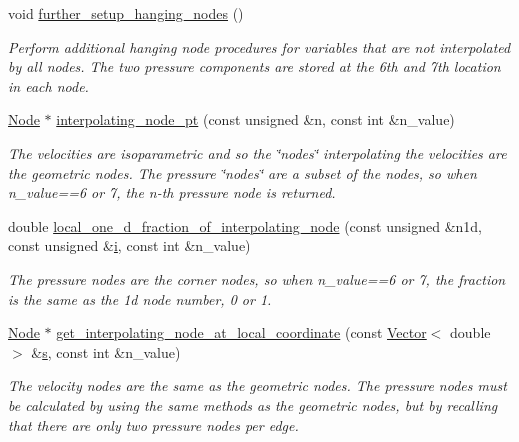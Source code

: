 \begin{DoxyCompactItemize}
void \hyperlink{classoomph_1_1RefineableLinearisedQTaylorHoodElement_a744e9dabce8e94de320d9baa362786af}{further\+\_\+setup\+\_\+hanging\+\_\+nodes} ()
\begin{DoxyCompactList}\small\item\em Perform additional hanging node procedures for variables that are not interpolated by all nodes. The two pressure components are stored at the 6th and 7th location in each node. \end{DoxyCompactList}\item 
\hyperlink{classoomph_1_1Node}{Node} $\ast$ \hyperlink{classoomph_1_1RefineableLinearisedQTaylorHoodElement_a85ac5379a96e6ca0cbe712218e494962}{interpolating\+\_\+node\+\_\+pt} (const unsigned \&n, const int \&n\+\_\+value)
\begin{DoxyCompactList}\small\item\em The velocities are isoparametric and so the \char`\"{}nodes\char`\"{} interpolating the velocities are the geometric nodes. The pressure \char`\"{}nodes\char`\"{} are a subset of the nodes, so when n\+\_\+value==6 or 7, the n-\/th pressure node is returned. \end{DoxyCompactList}\item 
double \hyperlink{classoomph_1_1RefineableLinearisedQTaylorHoodElement_a0dffc62fd56ef284763d9dc4ac7fa616}{local\+\_\+one\+\_\+d\+\_\+fraction\+\_\+of\+\_\+interpolating\+\_\+node} (const unsigned \&n1d, const unsigned \&\hyperlink{cfortran_8h_adb50e893b86b3e55e751a42eab3cba82}{i}, const int \&n\+\_\+value)
\begin{DoxyCompactList}\small\item\em The pressure nodes are the corner nodes, so when n\+\_\+value==6 or 7, the fraction is the same as the 1d node number, 0 or 1. \end{DoxyCompactList}\item 
\hyperlink{classoomph_1_1Node}{Node} $\ast$ \hyperlink{classoomph_1_1RefineableLinearisedQTaylorHoodElement_a3ca81c787638e7e8a66d123f7c52feb7}{get\+\_\+interpolating\+\_\+node\+\_\+at\+\_\+local\+\_\+coordinate} (const \hyperlink{classoomph_1_1Vector}{Vector}$<$ double $>$ \&\hyperlink{cfortran_8h_ab7123126e4885ef647dd9c6e3807a21c}{s}, const int \&n\+\_\+value)
\begin{DoxyCompactList}\small\item\em The velocity nodes are the same as the geometric nodes. The pressure nodes must be calculated by using the same methods as the geometric nodes, but by recalling that there are only two pressure nodes per edge. \end{DoxyCompactList}\item 

\end{DoxyCompactItemize}
